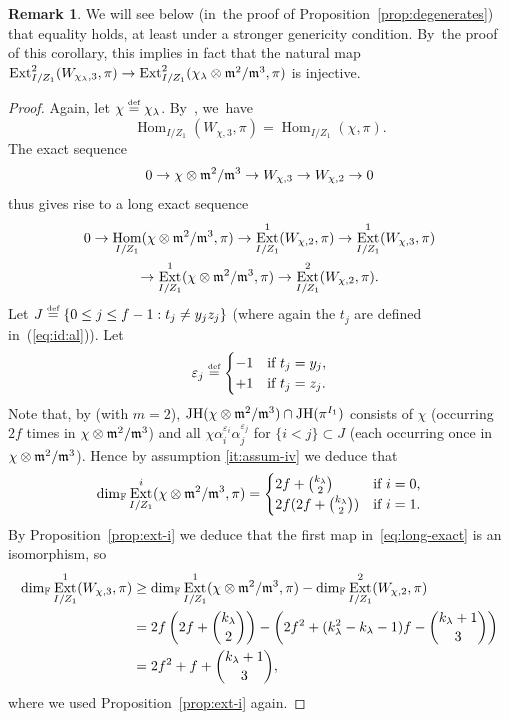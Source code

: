 \documentclass[JEP,XML,SOM,Unicode,NoFloatCountersInSection, NoEqCountersInSection,published]{cedram}
\newcommand{\defeq}{\stackrel{\textrm{\tiny{\upshape{def}}}}{=}}
\newcommand{\F}{\mathbb{F}}
\DeclareMathOperator{\Ext}{Ext}
\DeclareMathOperator{\Hom}{Hom}
\DeclareMathOperator{\JH}{\mathrm{JH}}
\let\ve\varepsilon
\theoremstyle{plain}
\theoremstyle{definition}
\newtheorem{rem}[prop]{Remark}
\begin{document}
\begin{rem}\label{rem:exi-i}
We will see below (in~the proof of Proposition~\ref{prop:degenerates}) that equality holds, {at least under a stronger genericity condition}. By~the proof of this corollary, this implies in fact that the natural map $\Ext^2_{I/Z_1}(W_{\chi_\lambda,3},\pi) \to \Ext^2_{I/Z_1}(\chi_\lambda \otimes \m^2/\m^3,\pi)$ is injective.
\end{rem}

\begin{proof}
Again, let $\chi \defeq \chi_\lambda$. By~\cite[Th.\,1.3]{HuWang2}, we~have\vspace*{-3pt}
\[
\Hom_{I/Z_1}(W_{\chi,3},\pi) = \Hom_{I/Z_1}(\chi,\pi).
\]
The exact sequence\vspace*{-3pt}
\[
0 \to \chi \otimes \mathfrak{m}^2/\mathfrak{m}^3 \to W_{\chi,3} \to W_{\chi,2} \to 0
\]
thus gives rise to a long exact sequence\vspace*{-5pt}
\begin{multline}\label{eq:long-exact}
0 \to \Hom_{I/Z_1}(\chi \otimes \m^2/\m^3,\pi) \to \Ext^1_{I/Z_1}(W_{\chi,2},\pi) \to \Ext^1_{I/Z_1}(W_{\chi,3},\pi) \\
\to \Ext^1_{I/Z_1}(\chi \otimes \m^2/\m^3,\pi) \to \Ext^2_{I/Z_1}(W_{\chi,2},\pi).
\end{multline}
Let $J \defeq \{ 0 \le j \le f-1: t_j \ne y_jz_j \}$ (where again the $t_j$ are defined in~(\ref{eq:id:al})).
Let
\[
\ve_j \defeq
\begin{cases}
-1&\text{if }t_j = y_j,\\
+1&\text{if }t_j = z_j.
\end{cases}
\]
Note that, by \cite[Lem.\,2.3.6(ii)]{BHHMS4} (with $m=2$), $\JH(\chi \otimes \m^2/\m^3) \cap \JH(\pi^{I_1})$ consists of $\chi$ (occurring $2f$ times in $\chi \otimes \mathfrak{m}^2/\mathfrak{m}^3$) and all $\chi \alpha_i^{\ve_i} \alpha_j^{\ve_j}$ for $\{i < j\} \subset J$ (each occurring once in $\chi \otimes \mathfrak{m}^2/\mathfrak{m}^3$).
Hence by assumption \eqref{it:assum-iv} we deduce that\enlargethispage{\baselineskip}
\begin{equation*}
\dim_\F \Ext^i_{I/Z_1}(\chi \otimes \m^2/\m^3,\pi) =
\begin{cases}
2f+\binom {k_\lambda}2 & \text{if $i = 0$},\\
2f(2f+\binom {k_\lambda}2) & \text{if $i = 1$}.
\end{cases}
\end{equation*}
By Proposition~\ref{prop:ext-i} we deduce that the first map in~\eqref{eq:long-exact} is an isomorphism, so
\begin{align*}
\dim_\F \Ext^1_{I/Z_1}(W_{\chi,3},\pi) &\ge \dim_\F \Ext^1_{I/Z_1}(\chi \otimes \m^2/\m^3,\pi) - \dim_\F \Ext^2_{I/Z_1}(W_{\chi,2},\pi) \\
&= 2f\left(2f+\binom{k_\lambda}2\right) - \left(2f^2+(k_\lambda^2-k_\lambda-1)f-\binom{k_\lambda+1}3\right)\\
&=2f^2+f+\binom{k_\lambda+1}3,
\end{align*}
where we used Proposition~\ref{prop:ext-i} again.
\end{proof}
\end{document}
